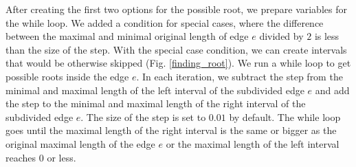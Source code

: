 After creating the first two options for the possible root, we prepare variables for the while loop. We added a condition for special cases, where the difference between the maximal and minimal original length of edge $e$ divided by $2$ is less than the size of the step. With the special case condition, we can create intervals that would be otherwise skipped (Fig. \ref{finding_root}). We run a while loop to get possible roots inside the edge $e$. In each iteration, we subtract the step from the minimal and maximal length of the left interval of the subdivided edge $e$ and add the step to the minimal and maximal length of the right interval of the subdivided edge $e$. The size of the step is set to $0.01$ by default. The while loop goes until the maximal length of the right interval is the same or bigger as the original maximal length of the edge $e$ or the maximal length of the left interval reaches $0$ or less.

